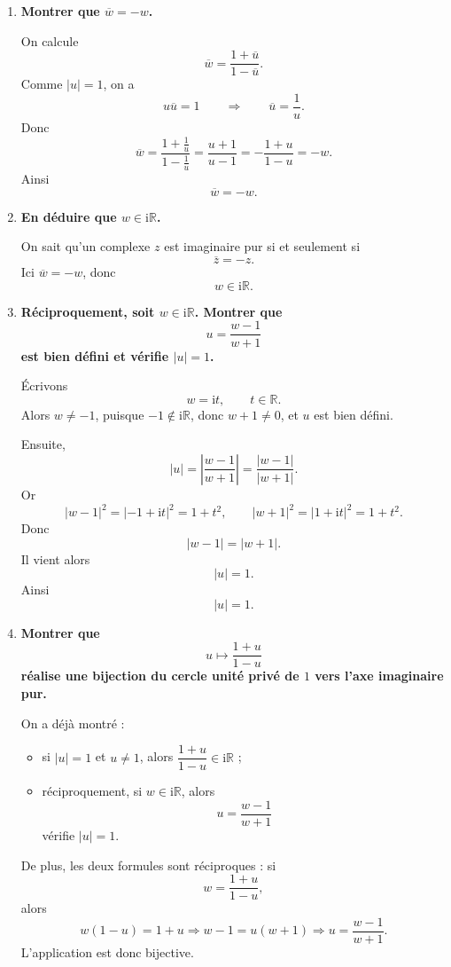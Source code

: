 \documentclass[11pt,a4paper]{article}
\newcommand{\R}{\mathbb{R}}
\newcommand{\ii}{\mathrm{i}}
\newcommand{\conj}[1]{\overline{#1}}
\begin{document}
\begin{enumerate}[label=\textbf{\arabic*.}]
    \item \textbf{Montrer que \(\conj{w}=-w\).}

    On calcule
    \[
    \conj{w}=\frac{1+\conj{u}}{1-\conj{u}}.
    \]
    Comme \(|u|=1\), on a
    \[
    u\conj{u}=1
    \qquad\Longrightarrow\qquad
    \conj{u}=\frac1u.
    \]
    Donc
    \[
    \conj{w}
    =\frac{1+\frac1u}{1-\frac1u}
    =\frac{u+1}{u-1}
    =-\frac{1+u}{1-u}
    =-w.
    \]
    Ainsi
    \[
    \boxed{\conj{w}=-w.}
    \]

    \item \textbf{En déduire que \(w\in\ii\R\).}

    On sait qu’un complexe \(z\) est imaginaire pur si et seulement si
    \[
    \conj{z}=-z.
    \]
    Ici \(\conj{w}=-w\), donc
    \[
    \boxed{w\in \ii\R.}
    \]

    \item \textbf{Réciproquement, soit \(w\in\ii\R\). Montrer que
    \[
    u=\frac{w-1}{w+1}
    \]
    est bien défini et vérifie \(|u|=1\).}

    Écrivons
    \[
    w=\ii t,\qquad t\in\R.
    \]
    Alors \(w\neq -1\), puisque \(-1\notin\ii\R\), donc \(w+1\neq 0\), et \(u\) est bien défini.

    Ensuite,
    \[
    |u|=\left|\frac{w-1}{w+1}\right|=\frac{|w-1|}{|w+1|}.
    \]
    Or
    \[
    |w-1|^2=|-1+\ii t|^2=1+t^2,
    \qquad
    |w+1|^2=|1+\ii t|^2=1+t^2.
    \]
    Donc
    \[
    |w-1|=|w+1|.
    \]
    Il vient alors
    \[
    |u|=1.
    \]
    Ainsi
    \[
    \boxed{|u|=1.}
    \]

    \item \textbf{Montrer que
    \[
    u\longmapsto \frac{1+u}{1-u}
    \]
    réalise une bijection du cercle unité privé de \(1\) vers l’axe imaginaire pur.}

    On a déjà montré :
    \begin{itemize}
        \item si \(|u|=1\) et \(u\neq 1\), alors \(\dfrac{1+u}{1-u}\in\ii\R\) ;
        \item réciproquement, si \(w\in\ii\R\), alors
        \[
        u=\frac{w-1}{w+1}
        \]
        vérifie \(|u|=1\).
    \end{itemize}
    De plus, les deux formules sont réciproques : si
    \[
    w=\frac{1+u}{1-u},
    \]
    alors
    \[
    w(1-u)=1+u
    \Longrightarrow
    w-1=u(w+1)
    \Longrightarrow
    u=\frac{w-1}{w+1}.
    \]
    L’application est donc bijective.


\end{enumerate}
\end{document}
